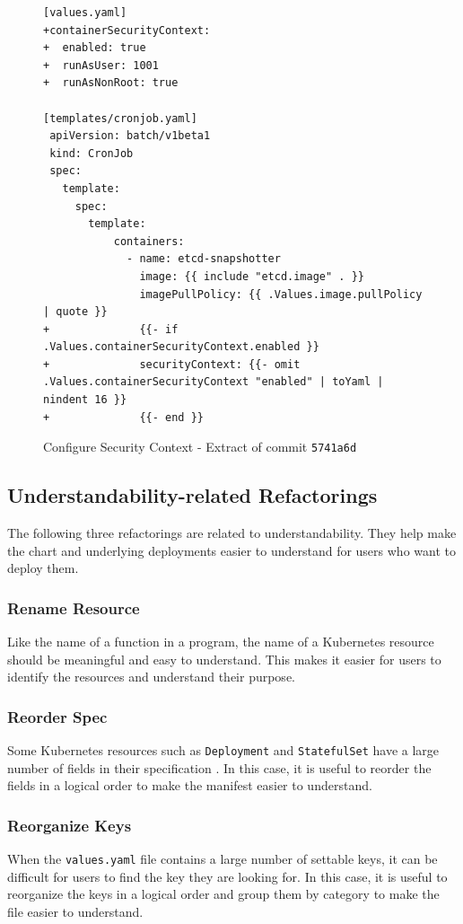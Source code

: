 \documentclass[conference]{IEEEtran}
\begin{document}
\begin{figure}
    \begin{verbatim}
[values.yaml]
+containerSecurityContext:
+  enabled: true
+  runAsUser: 1001
+  runAsNonRoot: true

[templates/cronjob.yaml]
 apiVersion: batch/v1beta1
 kind: CronJob
 spec:
   template:
     spec:
       template:
           containers:
             - name: etcd-snapshotter
               image: {{ include "etcd.image" . }}
               imagePullPolicy: {{ .Values.image.pullPolicy | quote }}
+              {{- if .Values.containerSecurityContext.enabled }}
+              securityContext: {{- omit .Values.containerSecurityContext "enabled" | toYaml | nindent 16 }}
+              {{- end }}
    \end{verbatim}
    \caption{Configure Security Context - Extract of commit \texttt{5741a6d}}
    \label{fig:sc}
\end{figure}

\subsection{Understandability-related Refactorings}

The following three refactorings are related to understandability. They help make the chart and underlying deployments easier to understand for users who want to deploy them.

\subsubsection{Rename Resource}
Like the name of a function in a program, the name of a Kubernetes resource should be meaningful and easy to understand. This makes it easier for users to identify the resources and understand their purpose.

\subsubsection{Reorder Spec}
Some Kubernetes resources such as \texttt{Deployment} and \texttt{StatefulSet} have a large number of fields in their specification \cite{apispec}. In this case, it is useful to reorder the fields in a logical order to make the manifest easier to understand.

\subsubsection{Reorganize Keys}
When the \texttt{values.yaml} file contains a large number of settable keys, it can be difficult for users to find the key they are looking for. In this case, it is useful to reorganize the keys in a logical order and group them by category to make the file easier to understand.
\end{document}
